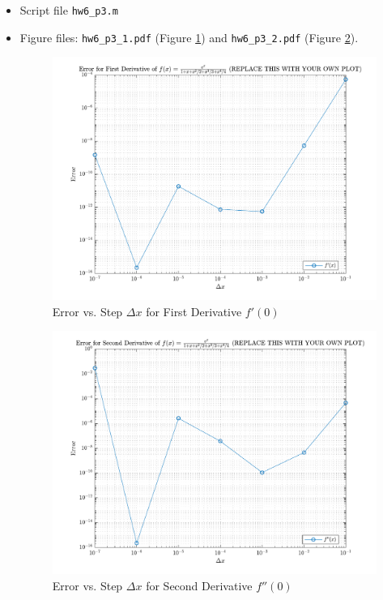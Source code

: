 \begin{solution}
  \quad
  \begin{itemize}
    \item
      Script file \verb|hw6_p3.m|
      
      \newpage
    \item
      Figure files: \verb|hw6_p3_1.pdf| (Figure \ref{fig:p31}) and \verb|hw6_p3_2.pdf| (Figure \ref{fig:p32}).
      \begin{figure}[!hbtp]
        \centering
        \includegraphics[width=0.75\linewidth]{../src/hw6_p3_1.pdf}
        \caption{Error vs. Step $\Delta x$ for First Derivative $f'(0)$}%
        \label{fig:p31}
      \end{figure}
      \begin{figure}[!hbtp]
        \centering
        \includegraphics[width=0.75\linewidth]{../src/hw6_p3_2.pdf}
        \caption{Error vs. Step $\Delta x$ for Second Derivative $f''(0)$}%
        \label{fig:p32}
      \end{figure}
  \end{itemize}
\end{solution}

